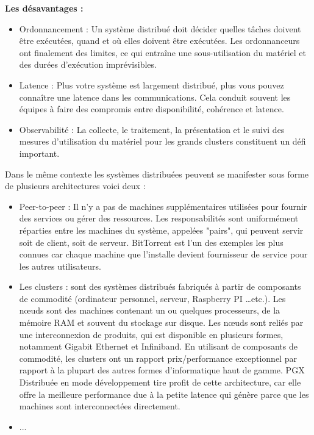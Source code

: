 \textbf{Les désavantages :}
\begin{itemize}[label=\textbullet]
\item  Ordonnancement : Un système distribué doit décider quelles tâches doivent être exécutées, quand et où elles doivent être exécutées. Les ordonnanceurs ont finalement des limites, ce qui entraîne une sous-utilisation du matériel et des durées d'exécution imprévisibles.
\item  Latence : Plus votre système est largement distribué, plus vous pouvez connaître une latence dans les communications. Cela conduit souvent les équipes à faire des compromis entre disponibilité, cohérence et latence.
\item  Observabilité : La collecte, le traitement, la présentation et le suivi des mesures d'utilisation du matériel pour les grands clusters constituent un défi important.
\end{itemize}

Dans le même contexte les systèmes distribuées peuvent se manifester sous forme de plusieurs architectures voici deux :\\
\begin{itemize}[label=\textbullet]
\item  Peer-to-peer : Il n'y a pas de machines supplémentaires utilisées pour fournir des services ou gérer des ressources. Les responsabilités sont uniformément réparties entre les machines du système, appelées "pairs", qui peuvent servir soit de client, soit de serveur. BitTorrent est l’un des exemples les plus connues car chaque machine que l’installe devient fournisseur de service pour les autres utilisateurs.
\item  Les clusters : sont des systèmes distribués fabriqués à partir de composants de commodité (ordinateur personnel, serveur, Raspberry PI …etc.). Les nœuds sont des machines contenant un ou quelques processeurs, de la mémoire RAM et souvent du stockage sur disque.
Les nœuds sont reliés par une interconnexion de produits, qui est disponible en plusieurs formes, notamment Gigabit Ethernet et Infiniband. En utilisant de composants de commodité, les clusters ont un rapport prix/performance exceptionnel par rapport à la plupart des autres formes d'informatique haut de gamme.
PGX Distribuée en mode développement tire profit de cette architecture, car elle offre la meilleure performance due à la petite latence qui génère parce que les machines sont interconnectées directement.
\item  ...
\end{itemize}

